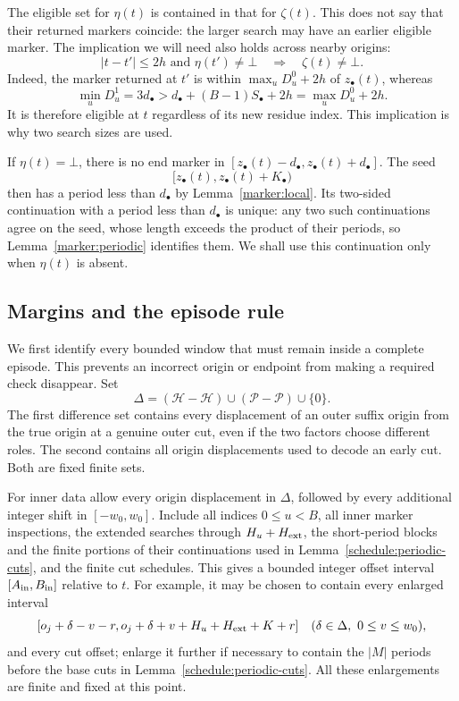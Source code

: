 The eligible set for $\eta(t)$ is contained in that for $\zeta(t)$.
This does not say that their returned markers coincide: the larger search
may have an earlier eligible marker. The implication we will need also
holds across nearby origins:
\begin{equation}\label{episode:nested-searches}
 |t-t'|\le2h\text{ and }\eta(t')\ne\bot
 \quad\Longrightarrow\quad \zeta(t)\ne\bot.
\end{equation}
Indeed, the marker returned at $t'$ is within
$\max_uD_u^0+2h$ of $z_\bullet(t)$, whereas
\[
 \min_uD_u^1=3d_\bullet>
 d_\bullet+(B-1)S_\bullet+2h=\max_uD_u^0+2h.
\]
It is therefore eligible at $t$ regardless of its new residue index.
This implication is why two search sizes are used.

If $\eta(t)=\bot$, there is no end marker in
$[z_\bullet(t)-d_\bullet,z_\bullet(t)+d_\bullet]$.  The seed
\begin{equation}\label{episode:seed}
 [z_\bullet(t),z_\bullet(t)+K_\bullet)
\end{equation}
then has a period less than $d_\bullet$ by
Lemma~\ref{marker:local}.  Its two-sided continuation with a period less
than $d_\bullet$ is unique: any two such continuations agree on the seed,
whose length exceeds the product of their periods, so
Lemma~\ref{marker:periodic} identifies them.  We shall use this continuation
only when $\eta(t)$ is absent.

\subsection{Margins and the episode rule}

We first identify every bounded window that must remain inside a complete
episode.  This prevents an incorrect origin or endpoint from making a
required check disappear.  Set
\[
 \Delta=(\mathcal H-\mathcal H)\cup(\mathcal P-\mathcal P)\cup\{0\}.
\]
The first difference set contains every displacement of an outer suffix
origin from the true origin at a genuine outer cut, even if the two
factors choose different roles.  The second contains all origin
displacements used to decode an early cut.  Both are fixed finite sets.

For inner data allow every origin displacement in $\Delta$, followed by
every additional integer shift in $[-w_0,w_0]$.  Include all indices
$0\le u<B$, all inner marker inspections, the extended searches through
$H_u+H_{\rm ext}$, the short-period blocks and the finite portions of their
continuations used in Lemma~\ref{schedule:periodic-cuts}, and the finite cut
schedules.  This gives a
bounded integer offset interval $[A_{\rm in},B_{\rm in}]$ relative to $t$.
For example, it may be chosen to contain every enlarged interval
\[
 [o_j+\delta-v-r,
   o_j+\delta+v+H_u+H_{\rm ext}+K+r]
 \quad
 (\delta\in\Delta,\ 0\le v\le w_0),
\]
and every cut offset; enlarge it further if necessary to contain the
$|M|$ periods before the base cuts in
Lemma~\ref{schedule:periodic-cuts}.  All these enlargements are finite and
fixed at this point.

